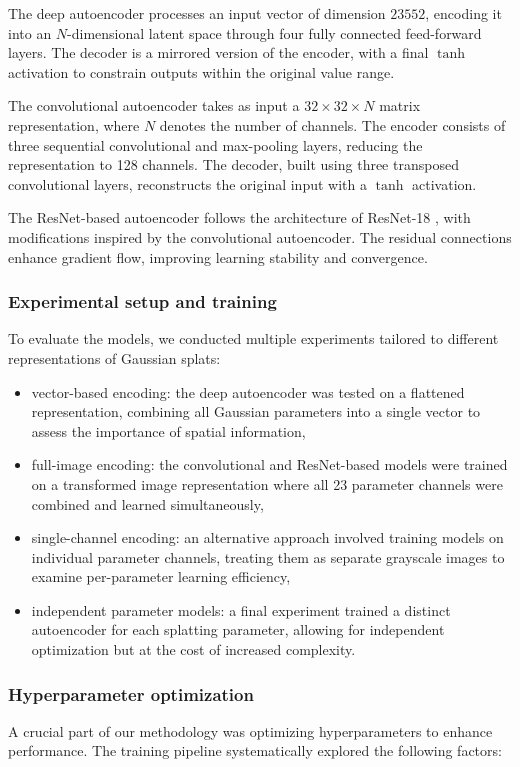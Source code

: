 The deep autoencoder processes an input vector of dimension $23552$, encoding it into an $N$-dimensional latent space through four fully connected feed-forward layers. The decoder is a mirrored version of the encoder, with a final $\tanh$ activation to constrain outputs within the original value range.

The convolutional autoencoder takes as input a $32 \times 32 \times N$ matrix representation, where $N$ denotes the number of channels. The encoder consists of three sequential convolutional and max-pooling layers, reducing the representation to 128 channels. The decoder, built using three transposed convolutional layers, reconstructs the original input with a $\tanh$ activation.

The ResNet-based autoencoder follows the architecture of ResNet-18 \cite{he2015deeprl}, with modifications inspired by the convolutional autoencoder. The residual connections enhance gradient flow, improving learning stability and convergence.

\subsubsection{Experimental setup and training}
To evaluate the models, we conducted multiple experiments tailored to different representations of Gaussian splats:

\begin{itemize}
\item vector-based encoding: the deep autoencoder was tested on a flattened representation, combining all Gaussian parameters into a single vector to assess the importance of spatial information,
\item full-image encoding: the convolutional and ResNet-based models were trained on a transformed image representation where all 23 parameter channels were combined and learned simultaneously,
\item single-channel encoding: an alternative approach involved training models on individual parameter channels, treating them as separate grayscale images to examine per-parameter learning efficiency,
\item independent parameter models: a final experiment trained a distinct autoencoder for each splatting parameter, allowing for independent optimization but at the cost of increased complexity.
\end{itemize}

\subsubsection{Hyperparameter optimization}
A crucial part of our methodology was optimizing hyperparameters to enhance performance. The training pipeline systematically explored the following factors:

